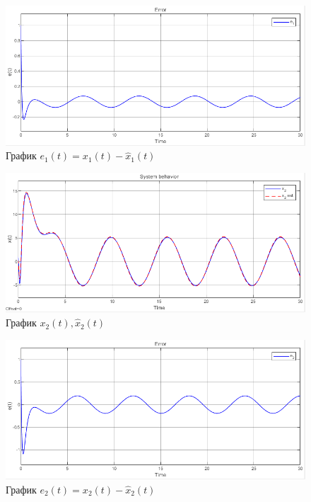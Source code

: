 \documentclass[a4paper, 12pt]{article}
\begin{document}
    \begin{figure}[H]
        \centering
        \includegraphics[scale=0.75]{3task_e1.png}
        \captionsetup{skip=0pt}
        \caption{График $e_1(t)=x_1(t)-\hat{x}_1(t)$}
        \label{fig:3task_e1}
    \end{figure}
    \begin{figure}[H]
        \centering
        \includegraphics[scale=0.75]{3task_x2.png}
        \captionsetup{skip=0pt}
        \caption{График $x_2(t),\hat{x}_2(t)$}
        \label{fig:3task_x2}
    \end{figure}
    \begin{figure}[H]
        \centering
        \includegraphics[scale=0.75]{3task_e2.png}
        \captionsetup{skip=0pt}
        \caption{График $e_2(t)=x_2(t)-\hat{x}_2(t)$}
        \label{fig:3task_e2}
    \end{figure}
\end{document}
